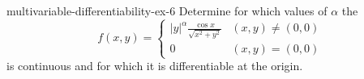 \documentclass[preview]{standalone}
\begin{document}
\begin{snippetexercise}{multivariable-differentiability-ex-6}{}
    Determine for which values of \(\alpha\) the \function
    \[
        f(x,y) = \begin{cases}
            {|y|}^\alpha \frac{\cos x}{\sqrt{x^2 + y^2}} & (x,y) \neq (0,0) \\
            0 & (x,y) = (0,0)
        \end{cases}
    \]
    is continuous and for which it is differentiable at the origin.
\end{snippetexercise}
\end{document}
